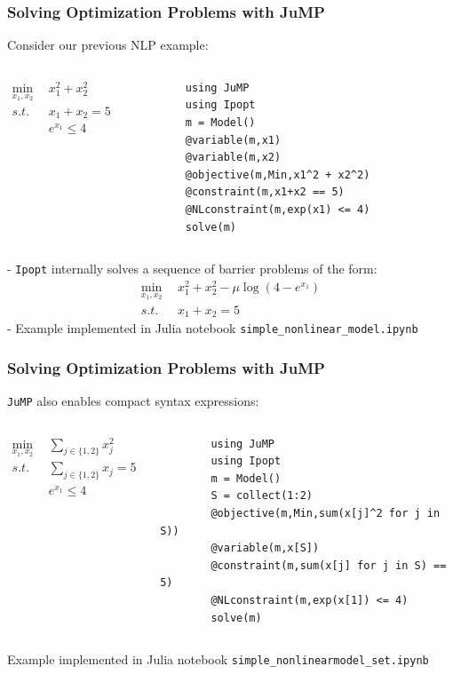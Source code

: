 \begin{frame}[fragile,t]
  \frametitle{Solving Optimization Problems with JuMP}
  Consider our previous NLP example:
  \begin{columns}
      \begin{align*}
          \min_{x_1,x_2} \ \ &x_1^2 + x_2^2\\
          s.t. \ \ &x_1 + x_2 = 5\\
          &e^{x_1} \le 4\\
      \end{align*}
      \lstset{ basicstyle = \scriptsize}
      \begin{lstlisting}
        using JuMP
        using Ipopt
        m = Model()
        @variable(m,x1)
        @variable(m,x2)
        @objective(m,Min,x1^2 + x2^2)
        @constraint(m,x1+x2 == 5)
        @NLconstraint(m,exp(x1) <= 4)
        solve(m)
      \end{lstlisting}
    \vspace{0.0cm}
  \end{columns}
 - {\tt Ipopt} internally solves a sequence of barrier problems of the form:
        \begin{align*}
          \min_{x_1,x_2} \ \ &x_1^2 + x_2^2-\mu \log (4-e^{x_1})\\
          s.t. \ \ &x_1 + x_2 = 5
      \end{align*}
- Example implemented in Julia notebook {\footnotesize {\tt simple_nonlinear_model.ipynb}}
\end{frame}

\begin{frame}[fragile,t]
  \frametitle{Solving Optimization Problems with JuMP}
  {\tt JuMP} also enables compact syntax expressions:
  \begin{columns}
      \begin{align*}
          \min_{x_1,x_2} \ \ &\sum_{j\in \{1,2\}}x_j^2\\
          s.t. \ \ &\sum_{j\in \{1,2\}}x_j= 5\\
          &e^{x_1} \le 4\\
      \end{align*}
      \lstset{ basicstyle = \scriptsize}
      \begin{lstlisting}
        using JuMP
        using Ipopt
        m = Model()
        S = collect(1:2)
        @objective(m,Min,sum(x[j]^2 for j in S))
        @variable(m,x[S])
        @constraint(m,sum(x[j] for j in S) == 5)
        @NLconstraint(m,exp(x[1]) <= 4)
        solve(m)
      \end{lstlisting}
    \vspace{0.5cm}
  \end{columns}
 Example implemented in Julia notebook {\footnotesize{\tt simple_nonlinearmodel_set.ipynb}}
\end{frame}
